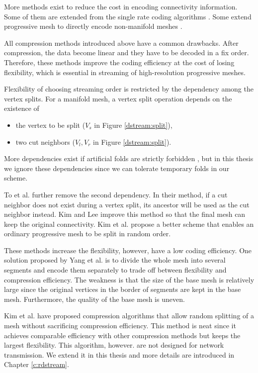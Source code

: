 \documentclass[11pt, a4paper]{report}
\begin{document}
    More methods exist to reduce the cost in encoding connectivity information.
    Some of them are extended from the single rate coding algorithms
    \cite{319426, 383281}. Some extend progressive mesh to directly
    encode non-manifold meshes \cite{258852}.

    All compression methods introduced above 
    have a common drawbacks. After compression, the 
    data become linear and they have to be decoded in a fix order. 
    Therefore, these methods improve the coding efficiency at the cost
    of losing flexibility, which is essential in streaming of high-resolution
    progressive meshes.
    
    Flexibility of choosing streaming order 
    is restricted by the dependency among the vertex splits.
    For a manifold mesh, a vertex split operation depends on the existence of
    \begin{itemize}
        \item 
    the vertex to be split ($V_s$ in Figure \ref{dstream:split}), 
        \item 
    two cut neighbors ($V_l, V_r$ in Figure \ref{dstream:split}). 
    \end{itemize}
    More dependencies exist if artificial folds are strictly forbidden \cite{258843, 258847}, 
    but in this thesis we ignore these dependencies since we can 
    tolerate temporary folds in our scheme.
     
    To et al. \cite{To1999} further remove the second dependency.
    In their method, if a cut neighbor does not exist during a vertex split,
    its ancestor will be used as the cut neighbor instead.
    Kim and Lee \cite{kim01truly} improve this method so that the final mesh
    can keep the original connectivity. 
    Kim et al. \cite{multiresolution:kim} propose a better scheme that enables
    an ordinary progressive mesh to be split in random order.

    These methods increase the flexibility, however, have a low coding efficiency.
    One solution proposed by Yang et al. \cite{progressive:Yang}
    is to divide the whole mesh into several segments and encode them
    separately to trade off between flexibility and compression efficiency.
    The weakness is that the size of the base mesh is relatively large
    since the original vertices in the border of segments are kept in the base
    mesh. Furthermore, the quality of the base mesh is uneven.

    Kim et al. \cite{multiresolution:kim}
    have proposed compression algorithms that allow random splitting of a mesh without
    sacrificing compression efficiency. This method is neat since it achieves comparable
    efficiency with other compression methods but keeps the largest flexibility.
    This algorithm, however. are not designed for 
	network transmission.  We extend it in this thesis and more details are introduced
    in Chapter \ref{c:rdstream}.  
\end{document}
